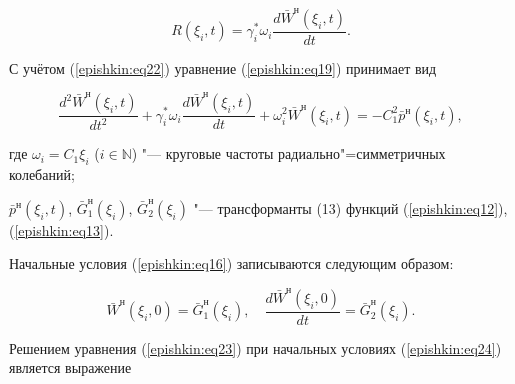 \begin{equation}

\label{epishkin:eq22}

R(\xi _i ,t)=\gamma _i^\ast   \omega _i   \frac{d\bar  W^{\text{н}} (\xi _i ,t)}{dt}.

\end{equation}

С учётом (\ref{epishkin:eq22}) уравнение (\ref{epishkin:eq19}) принимает вид

\begin{equation}

\label{epishkin:eq23}

\frac{d^2\bar  W^{\text{н}}(\xi _i ,t)} {dt^2}+\gamma _i^\ast  \omega _i   \frac{d\bar  W ^{\text{н}}(\xi _i ,t)}{dt}+

\omega _i^2   \bar  W ^{\text{н}}(\xi _i ,t)=-C_1^2   \bar  p ^{\text{н}}(\xi _i ,t),

\end{equation}

где  $\omega _i =C_1   \xi _i $ ($i \in \mathbb N$) "--- круговые частоты радиально"=симметричных колебаний;

$\bar  p ^{\text{н}}\left( {\xi _i ,t} \right)$, $\bar  G _1^{\text{н}} (\xi _i )$, $\bar  G _2^{\text{н}} (\xi _i )$ "--- трансформанты (13) функций (\ref{epishkin:eq12}), (\ref{epishkin:eq13}).





Начальные условия (\ref{epishkin:eq16}) записываются следующим образом:

\begin{equation}

\label{epishkin:eq24}

\bar  W ^{\text{н}}(\xi _i, 0)=\bar  G _1^{\text{н}} (\xi _i ), \quad 

\frac{d\bar  W ^{\text{н}}(\xi _i, 0)}{dt}=\bar  G _2^{\text{н}} (\xi_i ).

\end{equation}

Решением уравнения (\ref{epishkin:eq23}) при начальных условиях (\ref{epishkin:eq24}) является выражение

